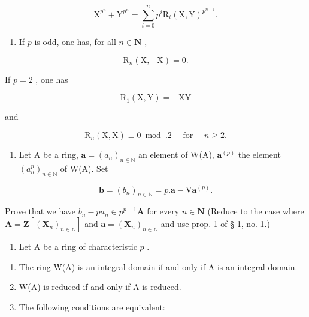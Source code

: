 \[
\mathrm{X} ^ {p ^ {n}} + \mathrm{Y} ^ {p ^ {n}} = \sum_ {i = 0} ^ {n} p ^ {i} \mathrm{R} _ {i} (\mathrm{X}, \mathrm{Y}) ^ {p ^ {n - i}}.
\]

\begin{enumerate}
\def\labelenumi{\alph{enumi})}
\setcounter{enumi}{1}
\tightlist
\item
  If \(p\) is odd, one has, for all \(n \in \mathbf{N}\) ,
\end{enumerate}

\[
\mathrm{R} _ {n} (\mathrm{X}, - \mathrm{X}) = 0.
\]

If \(p = 2\) , one has

\[
\mathrm{R} _ {1} (\mathrm{X}, \mathrm{Y}) = - \mathrm{XY}
\]

and

\[
\mathrm{R} _ {n} (\mathrm{X}, \mathrm{X}) \equiv 0 \bmod . 2 \quad \text { for } \quad n \geqslant 2.
\]

\begin{enumerate}
\def\labelenumi{\arabic{enumi})}
\setcounter{enumi}{3}
\tightlist
\item
  Let A be a ring, \(\boldsymbol{a} = (a_n)_{n \in \mathbb{N}}\) an element of W(A), \(\boldsymbol{a}^{(p)}\) the element \((a_n^p)_{n \in \mathbb{N}}\) of W(A). Set
\end{enumerate}

\[
\boldsymbol {b} = (b _ {n}) _ {n \in \mathbb {N}} = p. \boldsymbol {a} - \mathrm{V} \boldsymbol {a} ^ {(p)}.
\]

Prove that we have \(b_n - pa_n \in p^{p-1} \mathbf{A}\) for every \(n \in \mathbf{N}\) (Reduce to the case where \(\mathbf{A} = \mathbf{Z}[(\mathbf{X}_n)_{n \in \mathbb{N}}]\) and \(\boldsymbol{a} = (\mathbf{X}_n)_{n \in \mathbb{N}}\) and use prop. 1 of § 1, no. 1.)

\begin{enumerate}
\def\labelenumi{\arabic{enumi})}
\setcounter{enumi}{4}
\tightlist
\item
  Let A be a ring of characteristic \(p\) .
\end{enumerate}

\begin{enumerate}
\def\labelenumi{\alph{enumi})}
\item
  The ring W(A) is an integral domain if and only if A is an integral domain.
\item
  W(A) is reduced if and only if A is reduced.
\item
  The following conditions are equivalent:
\end{enumerate}


